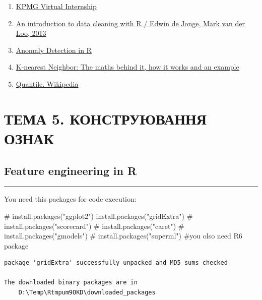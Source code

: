 \documentclass[
  letterpaper,
  DIV=11,
  numbers=noendperiod]{scrreprt}
\newenvironment{Shaded}{\begin{snugshade}}{\end{snugshade}}
\newcommand{\CommentTok}[1]{\textcolor[rgb]{0.37,0.37,0.37}{#1}}
\newcommand{\FunctionTok}[1]{\textcolor[rgb]{0.28,0.35,0.67}{#1}}
\newcommand{\NormalTok}[1]{\textcolor[rgb]{0.00,0.23,0.31}{#1}}
\newcommand{\StringTok}[1]{\textcolor[rgb]{0.13,0.47,0.30}{#1}}
\providecommand{\tightlist}{%
  \setlength{\itemsep}{0pt}\setlength{\parskip}{0pt}}\usepackage{longtable,booktabs,array}
\begin{document}
\begin{enumerate}
\def\labelenumi{\arabic{enumi}.}
\tightlist
\item
  \href{https://www.insidesherpa.com/virtual-internships/m7W4GMqeT3bh9Nb2c}{KPMG
  Virtual Internship}
\item
  \href{https://cran.r-project.org/doc/contrib/de_Jonge+van_der_Loo-Introduction_to_data_cleaning_with_R.pdf}{An
  introduction to data cleaning with R / Edwin de Jonge, Mark van der
  Loo, 2013}
\item
  \href{datacamp.com/courses/anomaly-detection-in-r}{Anomaly Detection
  in R}
\item
  \href{https://medium.com/analytics-vidhya/k-nearest-neighbor-the-maths-behind-it-how-it-works-and-an-example-f1de1208546c}{K-nearest
  Neighbor: The maths behind it, how it works and an example}
\item
  \href{https://en.wikipedia.org/wiki/Quantile}{Quantile. Wikipedia}
\end{enumerate}

\part{ТЕМА 5. КОНСТРУЮВАННЯ ОЗНАК}

\chapter{Feature engineering in R}\label{feature-engineering-in-r}

\begin{center}\rule{0.5\linewidth}{0.5pt}\end{center}

You need this packages for code execution:

\begin{Shaded}
\begin{Highlighting}[]
\CommentTok{\# install.packages("ggplot2")}
\FunctionTok{install.packages}\NormalTok{(}\StringTok{"gridExtra"}\NormalTok{)}
\CommentTok{\# install.packages("scorecard")}
\CommentTok{\# install.packages("caret")}
\CommentTok{\# install.packages("gmodels")}
\CommentTok{\# install.packages("superml") \#you olso need R6 package}
\end{Highlighting}
\end{Shaded}

\begin{verbatim}
package 'gridExtra' successfully unpacked and MD5 sums checked

The downloaded binary packages are in
    D:\Temp\Rtmpum9OKD\downloaded_packages
\end{verbatim}
\end{document}
